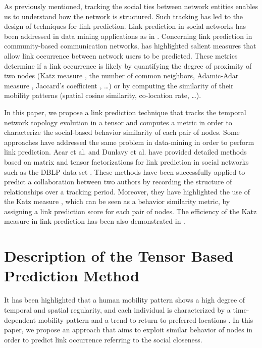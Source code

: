 \documentclass[conference]{IEEEtran}
\begin{document}
As previously mentioned, tracking the social ties between network
entities enables us to understand how the network is structured.
Such tracking has led to the design of techniques for link
prediction. Link prediction in social networks has been addressed in
data mining applications as in \cite{Acar2009,Dunlavy2011}.
Concerning link prediction in community-based communication
networks, \cite{Wang2011} has highlighted salient measures that
allow link occurrence between network users to be predicted. These
metrics determine if a link occurrence is likely by quantifying the
degree of proximity of two nodes (Katz measure \cite{Katz1953}, the
number of common neighbors, Adamic-Adar measure \cite{Adamic2003},
Jaccard's coefficient \cite{Jaccard1901,Salton1986}, \ldots) or by
computing the similarity of their mobility patterns (spatial cosine
similarity, co-location rate, \ldots).

In this paper, we propose a link prediction technique that tracks
the temporal network topology evolution in a tensor and computes a
metric in order to characterize the social-based behavior similarity
of each pair of nodes. Some approaches have addressed the same
problem in data-mining in order to perform link prediction. Acar et
al. \cite{Acar2009} and Dunlavy et al. \cite{Dunlavy2011} have
provided detailed methods based on matrix and tensor factorizations
for link prediction in social networks such as the DBLP data set
\cite{DBLP}. These methods have been successfully applied to predict
a collaboration between two authors by recording the structure of
relationships over a tracking period. Moreover, they have
highlighted the use of the Katz measure \cite{Katz1953}, which can
be seen as a behavior similarity metric, by assigning a link
prediction score for each pair of nodes. The efficiency of the Katz
measure in link prediction has been also demonstrated in
\cite{Acar2009,Dunlavy2011,Wang2011,Liben-Nowell2007}.

\section{Description of the Tensor Based Prediction Method}
It has been highlighted that a human mobility pattern shows a high
degree of temporal and spatial regularity, and each individual is
characterized by a time-dependent mobility pattern and a trend to
return to preferred locations \cite{Chaintreau07, Hsu2009a,
Thakur2010}. In this paper, we propose an approach that aims to
exploit similar behavior of nodes in order to predict link
occurrence referring to the social closeness.
\end{document}
